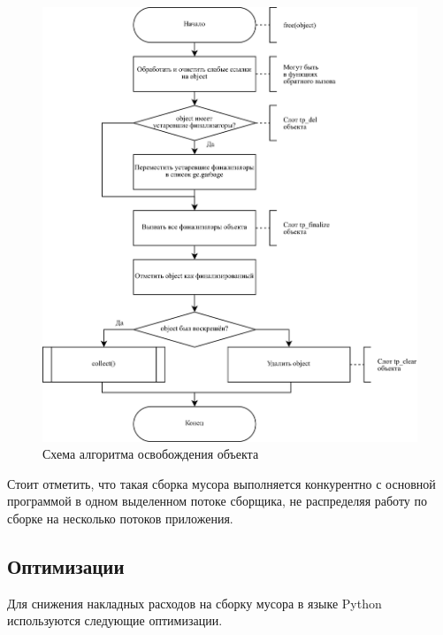 \begin{figure}[H]
	\centering
	\includegraphics[scale=0.175]{assets/python-free.png}
	\caption{Схема алгоритма освобождения объекта}
	\label{fig:python-free}
\end{figure}

Стоит отметить, что такая сборка мусора выполняется конкурентно с основной программой в одном выделенном потоке сборщика, не распределяя работу по сборке на несколько потоков приложения. \cite{python_threaded_gc}



\subsection{Оптимизации}

Для снижения накладных расходов на сборку мусора в языке Python используются следующие оптимизации.

